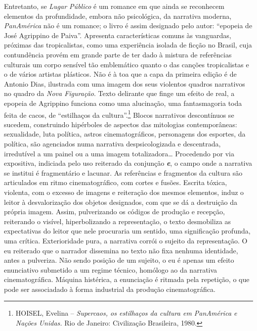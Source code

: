 Entretanto, se \emph{Lugar Público} é um romance em que ainda se
reconhecem elementos da profundidade, embora não psicológica, da
narrativa moderna, \emph{PanAmérica} não é um romance; o livro é assim
designado pelo autor: ``epopeia de José Agrippino de Paiva''. Apresenta
características comuns às vanguardas, próximas das tropicalistas, como
uma experiência isolada de ficção no Brasil, cuja contundência provém em
grande parte de ter dado à mistura de referências culturais um corpo
sensível tão emblemático quanto o das canções tropicalistas e o de
vários artistas plásticos. Não é à toa que a capa da primeira edição é
de Antonio Dias, ilustrada com uma imagem dos seus violentos quadros
narrativos no quadro da \emph{Nova Figuração}. Texto delirante que finge
um efeito de real, a epopeia de Agrippino funciona como uma alucinação,
uma fantasmagoria toda feita de cacos, de ``estilhaços da
cultura''.\footnote{\textsc{HOISEL}, Evelina -- \emph{Supercaos, os estilhaços da
  cultura em PanAmérica e Nações Unidas.} Rio de Janeiro: Civilização
  Brasileira, 1980.} Blocos narrativos descontínuos se sucedem,
construindo hipérboles de aspectos das mitologias contemporâneas:
sexualidade, luta política, astros cinematográficos, personagens dos
esportes, da política, são agenciados numa narrativa despsicologizada e
descentrada, irredutível a um painel ou a uma imagem totalizadora\ldots{}
Procedendo por via expositiva, indiciada pelo uso reiterado da conjunção %
\textbf{\emph{e}}, o campo onde a narrativa se institui é fragmentário e
lacunar. As referências e fragmentos da cultura são articulados em ritmo
cinematográfico, com cortes e fusões. Escrita tóxica, violenta, com o
excesso de imagens e reiteração dos mesmos elementos, induz o leitor à
desvalorização dos objetos designados, com que se dá a destruição da
própria imagem. Assim, pulverizando os códigos de produção e recepção,
reiterando o visível, hiperbolizando a representação, o texto
desmobiliza as expectativas do leitor que nele procuraria um sentido,
uma significação profunda, uma crítica. Exterioridade pura, a narrativa
corrói o sujeito da representação. O eu reiterado que o narrador
dissemina no texto não fixa nenhuma identidade, antes a pulveriza. Não
sendo posição de um sujeito, o eu é apenas um efeito enunciativo
submetido a um regime técnico, homólogo ao da narrativa cinematográfica.
Máquina histérica, a enunciação é ritmada pela repetição, o que pode ser
associadado à forma industrial da produção cinematográfica.

